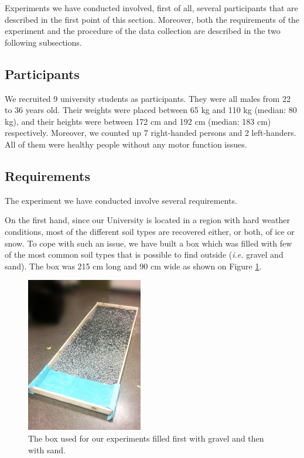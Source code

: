 \documentclass[conference]{IEEEtran}
\begin{document}
Experiments we have conducted involved, first of all, several participants that are described in the first point of this section. Moreover, both the requirements of the experiment and the procedure of the data collection are described in the two following subsections. 

\subsection{Participants}

We recruited 9 university students as participants. They were all males from 22 to 36 years old. Their weights were placed between 65 kg and 110 kg (median: 80 kg), and their heights were between 172 cm and 192 cm (median: 183 cm) respectively. Moreover, we counted up 7 right-handed persons and 2 left-handers. All of them were healthy people without any motor function issues.

\subsection{Requirements}

The experiment we have conducted involve several requirements. 

On the first hand, since our University is located in a region with hard weather conditions, most of the different soil types are recovered either, or both, of ice or snow. To cope with such an issue, we have built a box which was filled with few of the most common soil types that is possible to find outside (\textit{i.e.} gravel and sand). The box was 215 cm long and 90 cm wide as shown on Figure \ref{fig:box}.

\begin{figure}[!t]
  \centering
  \includegraphics[width=2in]{box}
  \caption{The box used for our experiments filled first with gravel and then with sand.}
  \label{fig:box}
\end{figure}
\end{document}

